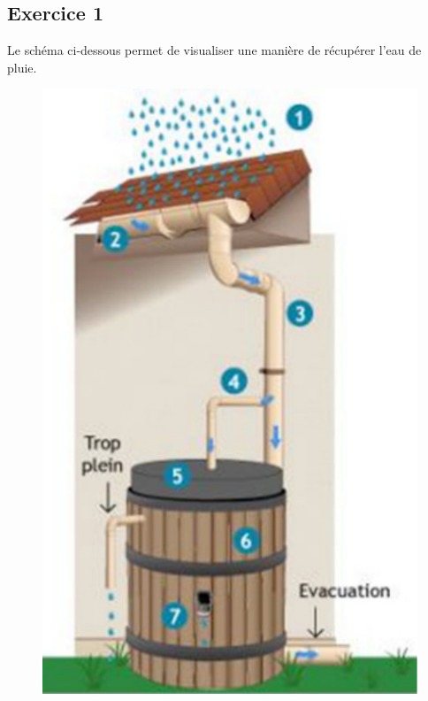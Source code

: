 \documentclass[12pt]{article}
\begin{document}

\subsection*{Exercice 1} 
Le schéma ci-dessous permet de visualiser une manière de récupérer l’eau de pluie.

\begin{multicols}{2}

  \begin{figure}[H]
    \centering
    \includegraphics[width=0.8\linewidth]{sources/plan.pdf}
  \end{figure}


\end{multicols}
\end{document}

